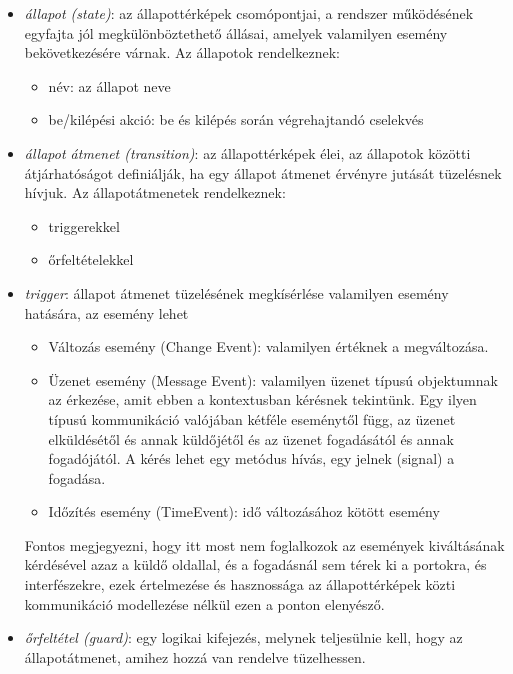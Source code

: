 \begin{itemize}
	\item \emph{állapot (state)}: az állapottérképek csomópontjai, a rendszer működésének egyfajta jól megkülönböztethető állásai, amelyek valamilyen esemény bekövetkezésére várnak. Az állapotok rendelkeznek:
	\begin{itemize}
		\item név: az állapot neve
		\item be/kilépési akció: be és kilépés során végrehajtandó cselekvés
	\end{itemize}
	
	\item \emph{állapot átmenet (transition)}: az állapottérképek élei, az állapotok közötti átjárhatóságot definiálják, ha egy állapot átmenet érvényre jutását tüzelésnek hívjuk. Az állapotátmenetek rendelkeznek:
		\begin{itemize}
			\item triggerekkel
			\item őrfeltételekkel
		\end{itemize}
	\item \emph{trigger}: állapot átmenet tüzelésének megkísérlése valamilyen esemény hatására, az esemény lehet
	\begin{itemize}
		\item Változás esemény (Change Event): valamilyen értéknek a megváltozása.
		\item Üzenet esemény (Message Event): valamilyen üzenet típusú objektumnak az érkezése, amit ebben a kontextusban kérésnek tekintünk. Egy ilyen típusú kommunikáció valójában kétféle eseménytől függ, az üzenet elküldésétől és annak küldőjétől és az üzenet fogadásától és annak fogadójától. A kérés lehet egy metódus hívás, egy jelnek (signal) a fogadása.
		\item Időzítés esemény (TimeEvent): idő változásához kötött esemény
	\end{itemize}
	Fontos megjegyezni, hogy itt most nem foglalkozok az események kiváltásának kérdésével azaz a küldő oldallal, és a fogadásnál sem térek ki a portokra, és interfészekre, ezek értelmezése és hasznossága az állapottérképek közti kommunikáció modellezése nélkül ezen a ponton elenyésző.
	\item \emph{őrfeltétel (guard)}: egy logikai kifejezés, melynek teljesülnie kell, hogy az állapotátmenet, amihez hozzá van rendelve tüzelhessen.

\end{itemize}
